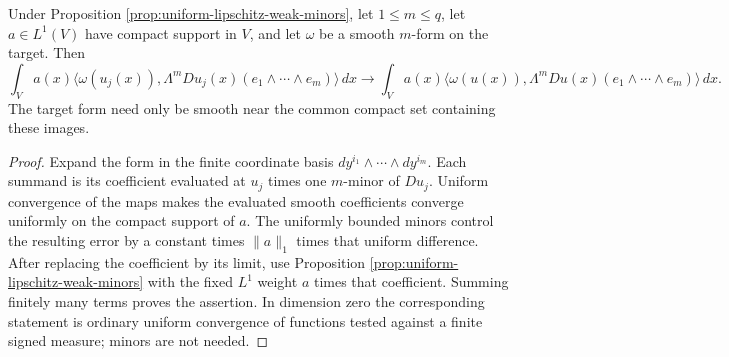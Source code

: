 \begin{lemma}\label{lem:weighted-pullback-weak-convergence}
Under Proposition \ref{prop:uniform-lipschitz-weak-minors}, let $1\leq m\leq q$, let $a\in L^1(V)$ have compact support in $V$, and let $\omega$ be a smooth $m$-form on the target. Then
\[
 \int_V a(x)\bigl\langle\omega(u_j(x)),
       \Lambda^mDu_j(x)(e_1\wedge\cdots\wedge e_m)\bigr\rangle\,dx
 \longrightarrow
 \int_V a(x)\bigl\langle\omega(u(x)),
       \Lambda^mDu(x)(e_1\wedge\cdots\wedge e_m)\bigr\rangle\,dx.
\]
The target form need only be smooth near the common compact set containing these images.
\end{lemma}
\begin{proof}
Expand the form in the finite coordinate basis $dy^{i_1}\wedge\cdots\wedge dy^{i_m}$. Each summand is its coefficient evaluated at $u_j$ times one $m$-minor of $Du_j$. Uniform convergence of the maps makes the evaluated smooth coefficients converge uniformly on the compact support of $a$. The uniformly bounded minors control the resulting error by a constant times $\|a\|_1$ times that uniform difference. After replacing the coefficient by its limit, use Proposition \ref{prop:uniform-lipschitz-weak-minors} with the fixed $L^1$ weight $a$ times that coefficient. Summing finitely many terms proves the assertion. In dimension zero the corresponding statement is ordinary uniform convergence of functions tested against a finite signed measure; minors are not needed.
\end{proof}

